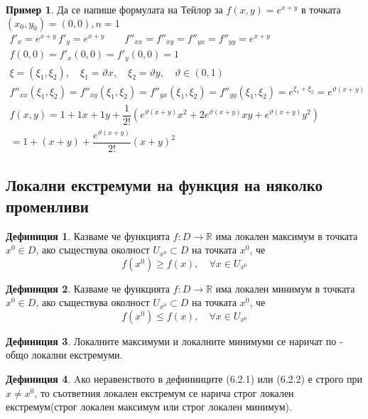 \documentclass[a4paper,fleqn,12pt]{article}
\theoremstyle{definition}
\newtheorem{definition}{Дефиниция}[subsection]
\newtheorem{example}{Пример}[subsection]
\begin{document}
\begin{example}
Да се напише формулата на Тейлор за $f(x,y) = e^{x+y}$ в точката $(x_0,y_0) = (0,0), n = 1$\\
\begin{gather*}
f'_x = e^{x+y}\,  f'_y = e^{x+y} \qquad f''_{xx} = f''_{xy} = f''_{yx} = f''_{yy} =  e^{x+y}\\
f(0,0) = f'_x (0,0) = f'_y(0,0) = 1 \\
\xi = (\xi_1, \xi_2), \quad \xi_1 = \vartheta x, \quad \xi_2 = \vartheta y, \quad \vartheta \in (0,1)\\
f''_{xx}(\xi_1, \xi_2) = f''_{xy}(\xi_1, \xi_2) = f''_{yx}(\xi_1, \xi_2) = f''_{yy}(\xi_1, \xi_2) =  e^{\xi_1 + \xi_2} =  e^{\vartheta(x+y)}\\
f(x,y) = 1 + 1x + 1y + \dfrac{1}{2!} \left(e^{\vartheta(x+y)}x^2 + 2e^{\vartheta(x+y)}xy + e^{\vartheta(x+y)}y^2 \right)\\
= 1+(x+y) + \dfrac{e^{\vartheta(x+y)}}{2!}(x+y)^2
\end{gather*}
\end{example}

\subsection{Локални екстремуми на функция на няколко променливи}

\begin{definition}
Казваме че функцията $f: D \to \mathbb{R}$ има локален максимум в точката $x^0 \in D$, ако съществува околност $U_{x^0} \subset D$ на точката $x^0$, че
$$f(x^0) \geq f(x), \quad \forall x \in U_{x^0}$$
\end{definition}

\begin{definition}
Казваме че функцията $f: D \to \mathbb{R}$ има локален минимум в точката $x^0 \in D$, ако съществува околност $U_{x^0} \subset D$ на точката $x^0$, че
$$f(x^0) \leq f(x), \quad \forall x \in U_{x^0}$$
\end{definition}

\begin{definition}
Локалните максимуми и локалните минимуми се наричат по - общо локални екстремуми. 
\end{definition}


\begin{definition}
Aко неравенството в дефинииците (6.2.1) или (6.2.2)  е строго при $x \neq x^0$, то съответния локален екстремум се нарича строг локален екстремум(строг локален максимум или строг локален минимум).
\end{definition}
\end{document}
